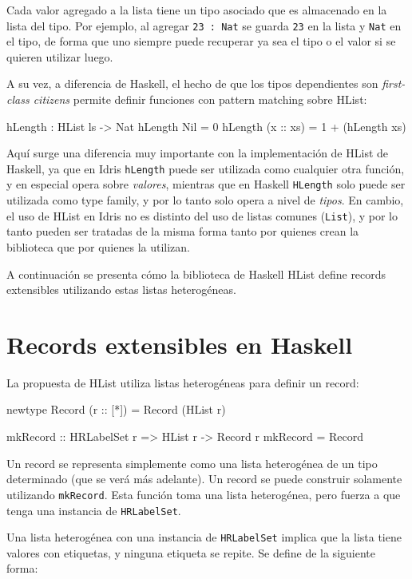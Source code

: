 Cada valor agregado a la lista tiene un tipo asociado que es almacenado en la lista del tipo. Por ejemplo, al agregar \texttt{23 : Nat} se guarda \texttt{23} en la lista y \texttt{Nat} en el tipo, de forma que uno siempre puede recuperar ya sea el tipo o el valor si se quieren utilizar luego.

A su vez, a diferencia de Haskell, el hecho de que los tipos dependientes son \textit{first-class citizens} permite definir funciones con pattern matching sobre HList:

\begin{code}
hLength : HList ls -> Nat
hLength Nil = 0
hLength (x :: xs) = 1 + (hLength xs)
\end{code}

Aquí surge una diferencia muy importante con la implementación de HList de Haskell, ya que en Idris \texttt{hLength} puede ser utilizada como cualquier otra función, y en especial opera sobre \textit{valores}, mientras que en Haskell \texttt{HLength} solo puede ser utilizada como type family, y por lo tanto solo opera a nivel de \textit{tipos}. En cambio, el uso de HList en Idris no es distinto del uso de listas comunes (\texttt{List}), y por lo tanto pueden ser tratadas de la misma forma tanto por quienes crean la biblioteca que por quienes la utilizan.

A continuación se presenta cómo la biblioteca de Haskell HList define records extensibles utilizando estas listas heterogéneas.

\section{Records extensibles en Haskell}

La propuesta de HList \cite{Kiselyov:2004:STH:1017472.1017488} utiliza listas heterogéneas para definir un record:

\begin{code}
newtype Record (r :: [*]) = Record (HList r)

mkRecord :: HRLabelSet r => HList r -> Record r
mkRecord = Record
\end{code}

Un record se representa simplemente como una lista heterogénea de un tipo determinado (que se verá más adelante). Un record se puede construir solamente utilizando \texttt{mkRecord}. Esta función toma una lista heterogénea, pero fuerza a que tenga una instancia de \texttt{HRLabelSet}.

Una lista heterogénea con una instancia de \texttt{HRLabelSet} implica que la lista tiene valores con etiquetas, y ninguna etiqueta se repite. Se define de la siguiente forma:

